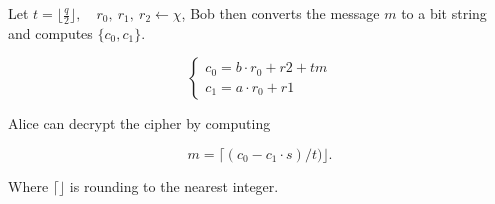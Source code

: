 \begin{definition}
    Let $t = \lfloor \frac{q}{2} \rfloor, \quad r_0,\ r_1,\ r_2
    \leftarrow \chi$, Bob then converts the message $m$ to a bit string and
    computes $\{c_0, c_1\}$.

    \[
        \begin{cases}
            c_0 = b \cdot r_0 + r2 + tm\\
            c_1 = a \cdot r_0 + r1
        \end{cases}
    \]

\end{definition}

\begin{definition}
    Alice can decrypt the cipher by computing

    \[m = \lceil (c_0 - c_1 \cdot s) / t) \rfloor. \]

    Where $\lceil \rfloor$ is rounding to the nearest integer.
\end{definition}

